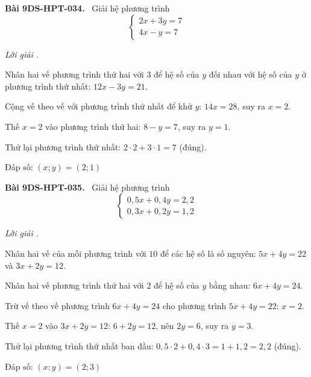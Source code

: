 \documentclass[12pt,a4paper]{article}
\newenvironment{problem}[1][]{\par\medskip\noindent\textbf{Bài #1.}\ }{\par}
\newenvironment{solution}[1][]{\par\noindent\textit{Lời giải #1.}\par}{\par}
\begin{document}
\begin{problem}[9DS-HPT-034]
Giải hệ phương trình
\[ \begin{cases} 2x + 3y = 7 \\ 4x - y = 7 \end{cases} \]

\begin{solution}
Nhân hai vế phương trình thứ hai với $3$ để hệ số của $y$ đối nhau với hệ số của $y$ ở phương trình thứ nhất: $12x - 3y = 21$.

Cộng vế theo vế với phương trình thứ nhất để khử $y$: $14x = 28$, suy ra $x = 2$.

Thế $x = 2$ vào phương trình thứ hai: $8 - y = 7$, suy ra $y = 1$.

Thử lại phương trình thứ nhất: $2 \cdot 2 + 3 \cdot 1 = 7$ (đúng).

Đáp số: $\boxed{(x; y) = (2; 1)}$
\end{solution}
\end{problem}

\begin{problem}[9DS-HPT-035]
Giải hệ phương trình
\[ \begin{cases} 0{,}5x + 0{,}4y = 2{,}2 \\ 0{,}3x + 0{,}2y = 1{,}2 \end{cases} \]

\begin{solution}
Nhân hai vế của mỗi phương trình với $10$ để các hệ số là số nguyên: $5x + 4y = 22$ và $3x + 2y = 12$.

Nhân hai vế phương trình thứ hai với $2$ để hệ số của $y$ bằng nhau: $6x + 4y = 24$.

Trừ vế theo vế phương trình $6x + 4y = 24$ cho phương trình $5x + 4y = 22$: $x = 2$.

Thế $x = 2$ vào $3x + 2y = 12$: $6 + 2y = 12$, nên $2y = 6$, suy ra $y = 3$.

Thử lại phương trình thứ nhất ban đầu: $0{,}5 \cdot 2 + 0{,}4 \cdot 3 = 1 + 1{,}2 = 2{,}2$ (đúng).

Đáp số: $\boxed{(x; y) = (2; 3)}$
\end{solution}
\end{problem}
\end{document}
